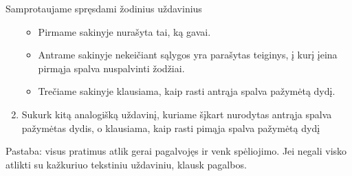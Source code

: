 \documentclass{article}
\begin{document}
\begin{mybox}{Samprotaujame spręsdami žodinius uždavinius}
\begin{enumerate}
\begin{itemize}
\item Pirmame sakinyje nurašyta tai, ką gavai.
\item Antrame sakinyje nekeičiant sąlygos yra parašytas teiginys, į kurį įeina pirmąja spalva nuspalvinti žodžiai.
\item Trečiame sakinyje klausiama, kaip rasti antrąja spalva pažymėtą dydį.
\end{itemize}
\item Sukurk kitą analogišką uždavinį, kuriame šįkart nurodytas antrąja spalva pažymėtas dydis, o klausiama, kaip rasti pimąja spalva pažymėtą dydį
\end{enumerate}
Pastaba: visus pratimus atlik gerai pagalvojęs ir venk spėliojimo. Jei negali visko atlikti su kažkuriuo tekstiniu uždaviniu, klausk pagalbos.
\end{mybox}
\end{document}
